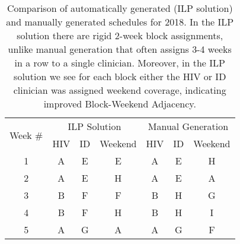 \begin{table}[htbp]
  \centering
  \caption{Comparison of automatically generated (ILP solution) and manually generated schedules for 2018. In the ILP solution there are rigid 2-week block assignments, unlike manual generation that often assigns 3-4 weeks in a row to a single clinician. Moreover, in the ILP solution we see for each block either the HIV or ID clinician was assigned weekend coverage, indicating improved Block-Weekend Adjacency.}%
  \label{tbl:2018-schedule-comparison}%
	\begin{adjustbox}{scale=0.8}
    \begin{tabular}{c||ccc||ccc}
    \multicolumn{1}{c||}{\multirow{2}[1]{*}{Week \#}} & \multicolumn{3}{c||}{ILP Solution} & \multicolumn{3}{c}{Manual Generation} \\
          & HIV   & ID    & Weekend & HIV   & ID    & Weekend \\
    \midrule
    \midrule
    1     & \cellcolor[rgb]{ .663,  .816,  .557}A & \cellcolor[rgb]{ .957,  .69,  .518}E & \cellcolor[rgb]{ .957,  .69,  .518}E & \cellcolor[rgb]{ .663,  .816,  .557}A & \cellcolor[rgb]{ .957,  .69,  .518}E & \cellcolor[rgb]{ .459,  .443,  .443}H \\
    2     & \cellcolor[rgb]{ .663,  .816,  .557}A & \cellcolor[rgb]{ .957,  .69,  .518}E & \cellcolor[rgb]{ .459,  .443,  .443}H & \cellcolor[rgb]{ .663,  .816,  .557}A & \cellcolor[rgb]{ .957,  .69,  .518}E & \cellcolor[rgb]{ .663,  .816,  .557}A \\
    3     & \cellcolor[rgb]{ .608,  .761,  .902}B & \cellcolor[rgb]{ .557,  .663,  .859}F & \cellcolor[rgb]{ .557,  .663,  .859}F & \cellcolor[rgb]{ .608,  .761,  .902}B & \cellcolor[rgb]{ .459,  .443,  .443}H & \cellcolor[rgb]{ .518,  .592,  .69}G \\
    4     & \cellcolor[rgb]{ .608,  .761,  .902}B & \cellcolor[rgb]{ .557,  .663,  .859}F & \cellcolor[rgb]{ .459,  .443,  .443}H & \cellcolor[rgb]{ .608,  .761,  .902}B & \cellcolor[rgb]{ .459,  .443,  .443}H & \cellcolor[rgb]{ .251,  .251,  .251}\textcolor[rgb]{ 1,  1,  1}{I} \\
    5     & \cellcolor[rgb]{ .663,  .816,  .557}A & \cellcolor[rgb]{ .518,  .592,  .69}G & \cellcolor[rgb]{ .663,  .816,  .557}A & \cellcolor[rgb]{ .663,  .816,  .557}A & \cellcolor[rgb]{ .518,  .592,  .69}G & \cellcolor[rgb]{ .557,  .663,  .859}F \\

\end{tabular}
\end{adjustbox}
\end{table}
